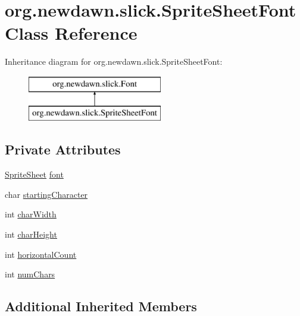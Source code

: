 \hypertarget{classorg_1_1newdawn_1_1slick_1_1_sprite_sheet_font}{}\section{org.\+newdawn.\+slick.\+Sprite\+Sheet\+Font Class Reference}
\label{classorg_1_1newdawn_1_1slick_1_1_sprite_sheet_font}
Inheritance diagram for org.\+newdawn.\+slick.\+Sprite\+Sheet\+Font\+:\begin{figure}[H]
\begin{center}
\leavevmode
\includegraphics[height=2.000000cm]{classorg_1_1newdawn_1_1slick_1_1_sprite_sheet_font}
\end{center}
\end{figure}
\subsection*{Private Attributes}
\begin{DoxyCompactItemize}
\item 
\mbox{\hyperlink{classorg_1_1newdawn_1_1slick_1_1_sprite_sheet}{Sprite\+Sheet}} \mbox{\hyperlink{classorg_1_1newdawn_1_1slick_1_1_sprite_sheet_font_abf61880556cdec6710cf96d7fa4c47b9}{font}}
\item 
char \mbox{\hyperlink{classorg_1_1newdawn_1_1slick_1_1_sprite_sheet_font_a6902ceb0cac8c8feafd830696a4928f4}{starting\+Character}}
\item 
int \mbox{\hyperlink{classorg_1_1newdawn_1_1slick_1_1_sprite_sheet_font_ac38271d5994a8fb4bdf689b5ef968093}{char\+Width}}
\item 
int \mbox{\hyperlink{classorg_1_1newdawn_1_1slick_1_1_sprite_sheet_font_a89d0e271ee8a6fc3f71a210b68dd8fbe}{char\+Height}}
\item 
int \mbox{\hyperlink{classorg_1_1newdawn_1_1slick_1_1_sprite_sheet_font_a1879945423e701083751fbb77e731d87}{horizontal\+Count}}
\item 
int \mbox{\hyperlink{classorg_1_1newdawn_1_1slick_1_1_sprite_sheet_font_ada7292037eaf2aa29213f67f5360546a}{num\+Chars}}
\end{DoxyCompactItemize}
\subsection*{Additional Inherited Members}


